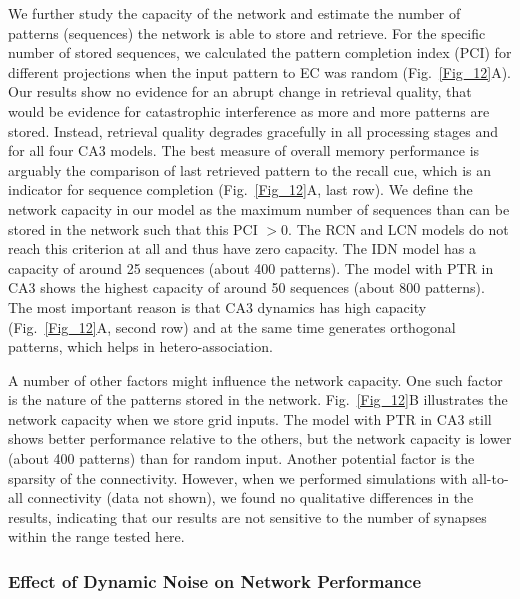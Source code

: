 \documentclass[utf8]{frontiersSCNS} %
\begin{document}
We further study the capacity of the network and estimate the number of patterns (sequences) the network is able to store and retrieve. For the specific number of stored sequences, we calculated the pattern completion index (PCI) for different projections when the input pattern to EC was random (Fig.~\ref{Fig_12}A). Our results show no evidence for an abrupt change in retrieval quality, that would be evidence for catastrophic interference as more and more patterns are stored. Instead, retrieval quality degrades gracefully in all processing stages and for all four CA3 models. The best measure of overall memory performance is arguably the comparison of last retrieved pattern to the recall cue, which is an indicator for sequence completion (Fig.~\ref{Fig_12}A, last row). We define the network capacity in our model as the maximum number of sequences than can be stored in the network such that this PCI $> 0$.
The RCN and LCN models do not reach this criterion at all and thus have zero capacity. The IDN model has a capacity of around 25 sequences (about 400 patterns). The model with PTR in CA3 shows the highest capacity of around 50 sequences (about 800 patterns). The most important reason is that CA3 dynamics has high capacity (Fig.~\ref{Fig_12}A, second row) and at the same time generates orthogonal patterns, which helps in hetero-association.  

A number of other factors might influence the network capacity. One such factor is the nature of the patterns stored in the network. Fig.~\ref{Fig_12}B illustrates the network capacity when we store grid inputs. The model with PTR in CA3 still shows better performance relative to the others, but the network capacity is lower (about 400 patterns) than for random input. Another potential factor is the sparsity of the connectivity. However, when we performed simulations with all-to-all connectivity (data not shown), we found no qualitative differences in the results, indicating that our results are not sensitive to the number of synapses within the range tested here. 

\subsubsection{Effect of Dynamic Noise on Network Performance}
\end{document}
